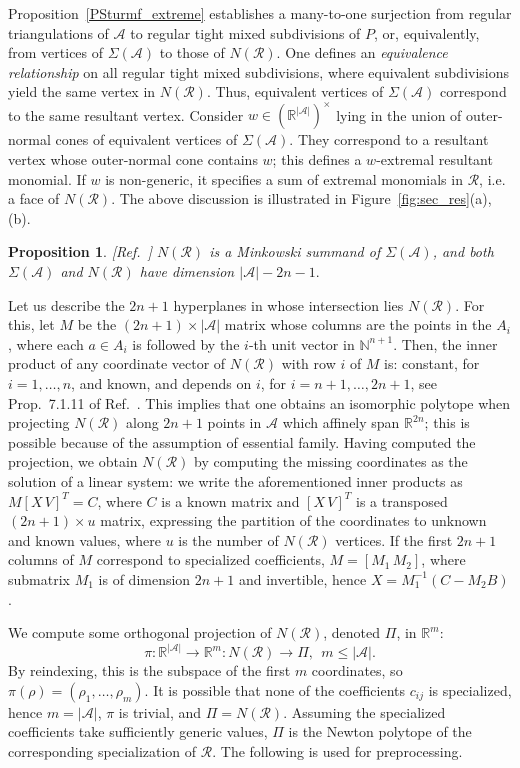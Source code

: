 \documentclass{article}
\newtheorem{proposition}{Proposition}
\newcommand\refcite[1]{\citealp{#1}} \newcommand\citess[1]{\textsuperscript{\textup{\citealp{#1}}}}
\def\NN{{\mathbb N}} \def\QQ{{\mathbb Q}}
\def\RR{{\mathbb R}} \def\ZZ{{\mathbb Z}}
\def\A{{\mathcal A}} \def\R{{\mathcal R}}
\begin{document}
Proposition~\ref{PSturmf_extreme} establishes
a many-to-one surjection from regular triangulations of $\A$ to
regular tight mixed subdivisions of $P$, or, equivalently,
from vertices of $\Sigma(\A)$ to those of $N(\R)$.
One defines an {\em equivalence relationship} on all regular tight mixed
subdivisions, where equivalent subdivisions yield the same vertex in $N(\R)$. 
Thus, equivalent vertices of $\Sigma(\A)$ correspond to the same
resultant vertex.
Consider $w\in (\RR^{|\A|})^{\times}$ lying in the union of
outer-normal cones of equivalent vertices of $\Sigma(\A)$.
They correspond to a resultant vertex whose outer-normal cone
contains $w$; this defines a $w$-extremal resultant monomial.
If $w$ is non-generic, it specifies a sum of extremal monomials in $\R$,
i.e. a face of $N(\R)$.
The above discussion is illustrated in Figure~\ref{fig:sec_res}(a),(b).

\begin{proposition}\label{Psummand_dimRes}{\rm [Ref.~\refcite{GKZ}]}
$N(\R)$ is a Minkowski summand of 
$\Sigma(\A)$, and both $\Sigma(\A)$ and $N(\R)$ have 
dimension $|\A| -2n-1.$
\end{proposition} 

Let us describe the $2n+1$ hyperplanes in whose intersection lies $N(\R)$.
For this, let $M$ be the $(2n+1)\times |\A|$ matrix whose columns are the
points in the $A_i$, where each $a\in A_i$ is followed by
the $i$-th unit vector in $\NN^{n+1}$.
Then, the inner product of any coordinate vector of $N(\R)$ with row $i$
of $M$ is: constant, for $i=1,\dots,n$, and known, and depends on $i$,
for $i=n+1,\dots,2n+1$, see Prop.~7.1.11 of Ref.~\refcite{GKZ}.
This implies that one obtains an isomorphic polytope when projecting
$N(\R)$ along $2n+1$ points in $\A$ which affinely span $\RR^{2n}$;
this is possible because of the assumption of essential family.
Having computed the projection, we obtain $N(\R)$ by computing
the missing coordinates as the solution of a linear system:
we write the aforementioned inner products as $M [ X\, V]^T = C$, where $C$
is a known matrix and $[ X\, V]^T$ is a transposed $(2n+1)\times u$ matrix,
expressing the partition of the coordinates to unknown and known values,
where $u$ is the number of $N(\R)$ vertices. 
If the first $2n+1$ columns of $M$ correspond to specialized coefficients, 
$M = [M_1\, M_2]$, where submatrix $M_1$ is of dimension $2n+1$
and invertible, hence $X=M_1^{-1}(C-M_2B)$.

We compute some orthogonal projection of $N(\R)$, denoted
$\varPi$, in $\RR^m$:
$$
\pi:\RR^{|\A|}\rightarrow \RR^m : N(\R)\rightarrow \varPi,\;\, m \le |\A| .
$$
By reindexing, this is the subspace of the first $m$ coordinates,
so\linebreak
$\pi(\rho)=(\rho_1,\dots,\rho_m)$.
It is possible that none of the coefficients $c_{ij}$ is specialized,
hence $m = |\A|$, $\pi$ is trivial, and $\varPi=N(\R)$.
Assuming the specialized coefficients take sufficiently
generic values, $\varPi$ is the Newton polytope of the corresponding
specialization of $\R$.
The following is used for preprocessing.
\end{document}
